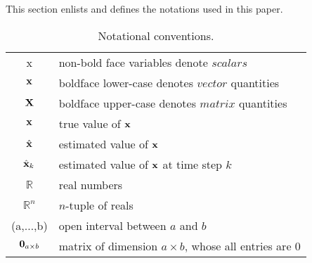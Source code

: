 \cyan
This section enlists and defines the notations used in this paper.
\begin{table}[h!]
	\centering
	\begin{tabular}[h]{|c|l|}
		\hline
		x 				& non-bold face variables denote $scalars$ 			\T \\
		$\mathbf{x}$ 		& boldface lower-case denotes $vector$ quantities	\T \\ 	
		$\mathbf{X}$ 		& boldface upper-case denotes $matrix$ quantities	\T \\
		$\mathbf{x}$ 		& true value of $\mathbf{x}$ 							\T \\  	
		$\hat{\mathbf{x}}$ 	& estimated value of $\mathbf{x}$						\T \\	
		$\hat{\mathbf{x}}_{k}$ & estimated value of $\mathbf{x}$ at time step $k$	\T \\	
		$\mathbb{R}$ 	& real numbers										\T \\ 	
		$\mathbb{R}^n$ 	& $n$-tuple of reals								\T \\
		(a,$\dots$,b) 	& open interval	between $a$ and $b$					\T \\
		$\boldsymbol{0}_{a \times b}$ 	& matrix of dimension $a \times b $, whose all entries are 0 	\T \\
		\hline
		
	\end{tabular}
	\caption{Notational conventions.}
	\label{table:notation}
\end{table}

\black